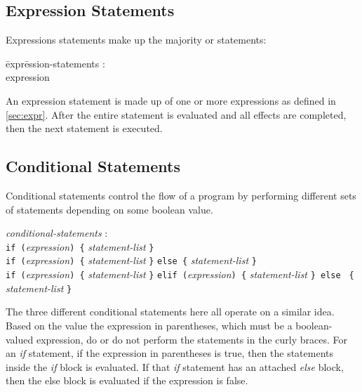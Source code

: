 \documentclass{article}
\begin{document}
\subsection{Expression Statements}
Expressions statements make up the majority or statements:

\begin{itshape}
\begin{tabbing}
	\= expr\=ession-statements : \\
		\>\> expression
\end{tabbing}
\end{itshape}

An expression statement is made up of one or more expressions as defined in \ref{sec:expr}. After the entire statement is evaluated and all effects are completed, then the next statement is executed.

\subsection{Conditional Statements}
Conditional statements control the flow of a program by performing different sets of statements depending on some boolean value. 

\begin{tabbing}
	\= \emph{cond}\=\emph{itional-statements} : \\
		\> \> \texttt{if (}\emph{expression}\texttt{) \{} \emph{statement-list} \texttt{\}}\\
		\>\>  \texttt{if (}\emph{expression}\texttt{) \{} \emph{statement-list} \texttt{\}} \texttt{else}\texttt{ \{} \emph{statement-list} \texttt{\}} \\
		\>\>  \texttt{if (}\emph{expression}\texttt{) \{} \emph{statement-list} \texttt{\}} \texttt{elif (}\emph{expression}\texttt{) \{} \emph{statement-list} \texttt{\}}\texttt{ else} \texttt{ \{} \emph{statement-list} \texttt{\}} \\
\end{tabbing}

The three different conditional statements here all operate on a similar idea. Based on the value the expression in parentheses, which must be a boolean-valued expression, do or do not perform the statements in the curly braces. For an \emph{if} statement, if the expression in parentheses is true, then the statements inside the \emph{if} block is evaluated. If that \emph{if} statement has an attached \emph{else} block, then the else block is evaluated if the expression is false. 
\end{document}
